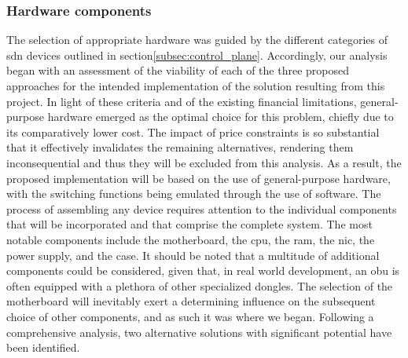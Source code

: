 \subsubsection{Hardware components}
The selection of appropriate hardware was guided by the different categories of \gls{sdn} devices outlined in section\ref{subsec:control_plane}. Accordingly, our analysis began with an assessment of the viability of each of the three proposed approaches for the intended implementation of the solution resulting from this project. In light of these criteria and of the existing financial limitations, general-purpose hardware emerged as the optimal choice for this problem, chiefly due to its comparatively lower cost. The impact of price constraints is so substantial that it effectively invalidates the remaining alternatives, rendering them inconsequential and thus they will be excluded from this analysis. As a result, the proposed implementation will be based on the use of general-purpose hardware, with the switching functions being emulated through the use of software.
The process of assembling any device requires attention to the individual components that will be incorporated and that comprise the complete system. The most notable components include the motherboard, the \gls{cpu}, the \gls{ram}, the \gls{nic}, the power supply, and the case. It should be noted that a multitude of additional components could be considered, given that, in real world development, an \gls{obu} is often equipped with a plethora of other specialized dongles.
The selection of the motherboard will inevitably exert a determining influence on the subsequent choice of other components, and as such it was where we began. Following a comprehensive analysis, two alternative solutions with significant potential have been identified. 
